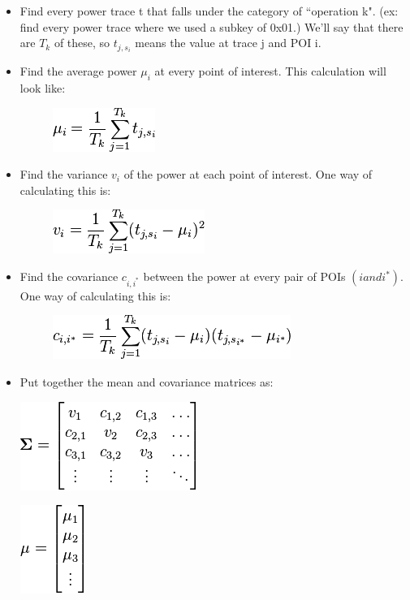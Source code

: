     \begin{itemize}
      \item Find every power trace t that falls under the category of
      ``operation k". (ex: find every power trace where we used a subkey of
      0x01.) We'll say that there are $T_k$ of these, so $t_{j, s_i}$ means the
      value at trace j and POI i.
      \item Find the average power $\mu_i$ at every point of interest. This
      calculation will look like:
      \begin{figure}[htp]
      \centering
      \includegraphics{images/Lecture_5/pc1.png}
      \end{figure}
       
      \item Find the variance $v_i$ of the power at each point of interest. One
      way of calculating this is:
      \begin{figure}[htp]
      \centering
      \includegraphics{images/Lecture_5/pic2.png}
      \end{figure}
    
      \item Find the covariance $c_{i, i^*}$ between the power at every pair of
      POIs $(i and i^*)$. One way of calculating this is:
      \begin{figure}[htp]
      \centering
      \includegraphics{images/Lecture_5/pic3.png}
      \end{figure}
      \item Put together the mean and covariance matrices as:
    
      \begin{minipage}{\linewidth}
      \centering
      \includegraphics{images/Lecture_5/pic5.png}
      \end{minipage}
      \begin{minipage}{\linewidth}
      \centering
      \includegraphics{images/Lecture_5/pic4.png}
      \end{minipage}
      

\end{itemize}
